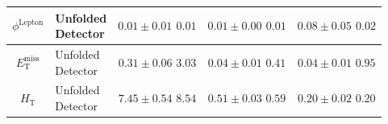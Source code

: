 \begin{tabular}{cl|ccc}
  \midrule
  $\phi^\mathrm{Lepton}$ & \makecell[l]{Unfolded \\ Detector} & \makecell[l]{$0.01 \pm 0.01$ \\ $0.01$} & \makecell[l]{$0.01 \pm 0.00$ \\ $0.01$} & \makecell[l]{$0.08 \pm 0.05$ \\ $0.02$}\\
  \midrule\midrule
  $E_\mathrm{T}^\mathrm{miss}$ & \makecell[l]{Unfolded \\ Detector} & \makecell[l]{$0.31 \pm 0.06$ \\ $3.03$} & \makecell[l]{$0.04 \pm 0.01$ \\ $0.41$} & \makecell[l]{$0.04 \pm 0.01$ \\ $0.95$}\\
  \midrule
  $H_\mathrm{T}$ & \makecell[l]{Unfolded \\ Detector} & \makecell[l]{$7.45 \pm 0.54$ \\ $8.54$} & \makecell[l]{$0.51 \pm 0.03$ \\ $0.59$} & \makecell[l]{$0.20 \pm 0.02$ \\ $0.20$}\\
  \bottomrule
\end{tabular}

